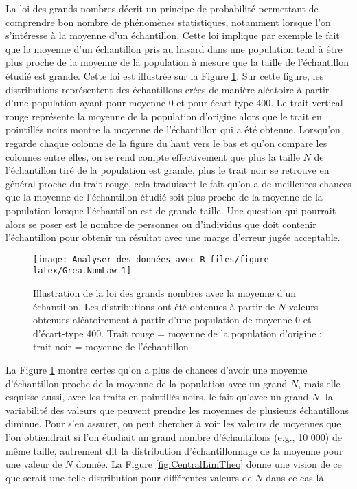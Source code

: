 \documentclass[
]{book}
\begin{document}
La loi des grands nombres décrit un principe de probabilité permettant de comprendre bon nombre de phénomènes statistiques, notamment lorsque l'on s'intéresse à la moyenne d'un échantillon. Cette loi implique par exemple le fait que la moyenne d'un échantillon pris au hasard dans une population tend à être plus proche de la moyenne de la population à mesure que la taille de l'échantillon étudié est grande. Cette loi est illustrée sur la Figure \ref{fig:GreatNumLaw}. Sur cette figure, les distributions représentent des échantillons crées de manière aléatoire à partir d'une population ayant pour moyenne 0 et pour écart-type 400. Le trait vertical rouge représente la moyenne de la population d'origine alors que le trait en pointillés noirs montre la moyenne de l'échantillon qui a été obtenue. Lorsqu'on regarde chaque colonne de la figure du haut vers le bas et qu'on compare les colonnes entre elles, on se rend compte effectivement que plus la taille \(N\) de l'échantillon tiré de la population est grande, plus le trait noir se retrouve en général proche du trait rouge, cela traduisant le fait qu'on a de meilleures chances que la moyenne de l'échantillon étudié soit plus proche de la moyenne de la population lorsque l'échantillon est de grande taille. Une question qui pourrait alors se poser est le nombre de personnes ou d'individus que doit contenir l'échantillon pour obtenir un résultat avec une marge d'erreur jugée acceptable.

\begin{figure}

{\centering \texttt{[image: Analyser-des-données-avec-R\_files/figure-latex/GreatNumLaw-1]} 

}

\caption{Illustration de la loi des grands nombres avec la moyenne d'un échantillon. Les distributions ont été obtenues à partir de $N$ valeurs obtenues aléatoirement à partir d'une population de moyenne 0 et d'écart-type 400. Trait rouge = moyenne de la population d'origine ; trait noir = moyenne de l'échantillon}\label{fig:GreatNumLaw}
\end{figure}

La Figure \ref{fig:GreatNumLaw} montre certes qu'on a plus de chances d'avoir une moyenne d'échantillon proche de la moyenne de la population avec un grand \(N\), mais elle esquisse aussi, avec les traits en pointillés noirs, le fait qu'avec un grand \(N\), la variabilité des valeurs que peuvent prendre les moyennes de plusieurs échantillons diminue. Pour s'en assurer, on peut chercher à voir les valeurs de moyennes que l'on obtiendrait si l'on étudiait un grand nombre d'échantillons (e.g., 10 000) de même taille, autrement dit la distribution d'échantillonnage de la moyenne pour une valeur de \(N\) donnée. La Figure \ref{fig:CentralLimTheo} donne une vision de ce que serait une telle distribution pour différentes valeurs de \(N\) dans ce cas là.
\end{document}
